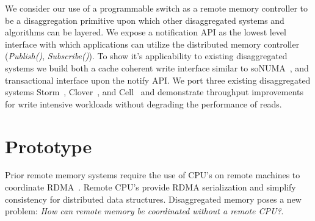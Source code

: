 
We consider our use of a programmable switch as a remote memory
controller to be a disaggregation primitive upon which other
disaggregated systems and algorithms can be layered. We expose a
notification API as the lowest level interface with which applications
can utilize the distributed memory controller (\textit{Publish()},
\textit{Subscribe()}). To show it's applicability to existing
disaggregated systems we build both a cache coherent write interface
similar to soNUMA~\cite{sonuma}, and transactional interface upon the
notify API. We port three existing disaggregated systems
Storm~\cite{storm}, Clover~\cite{clover}, and Cell~\cite{cell} and
demonstrate throughput improvements for write intensive workloads
without degrading the performance of reads.


\section{Prototype}
Prior remote memory systems require the use of CPU's on remote
machines to coordinate RDMA~\cite{cell,sonuma,storm,erpc,farm}. Remote
CPU's provide RDMA serialization and simplify consistency for
distributed data structures. Disaggregated memory poses a new problem:
\textit{How can remote memory be coordinated without a remote CPU?}.


